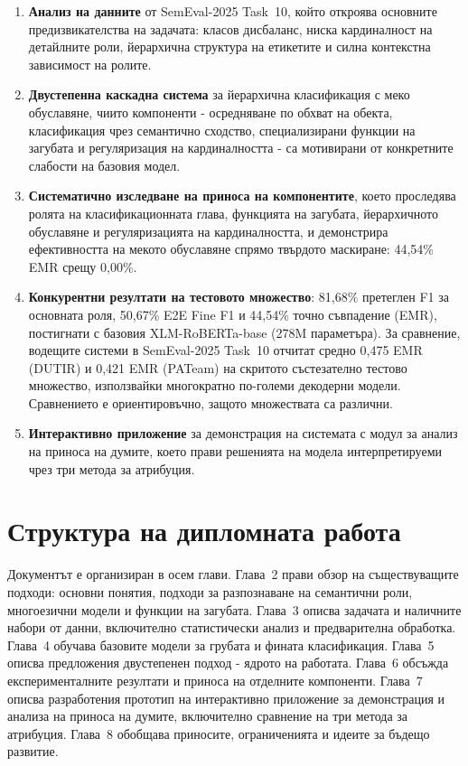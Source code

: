 \documentclass[12pt,a4paper]{report}
\begin{document}
\begin{enumerate}
  \item \textbf{Анализ на данните} от SemEval-2025 Task~10, който откроява основните предизвикателства на задачата: класов дисбаланс, ниска кардиналност на детайлните роли, йерархична структура на етикетите и силна контекстна зависимост на ролите.
  \item \textbf{Двустепенна каскадна система} за йерархична класификация с меко обуславяне, чиито компоненти - осредняване по обхват на обекта, класификация чрез семантично сходство, специализирани функции на загубата и регуляризация на кардиналността - са мотивирани от конкретните слабости на базовия модел.
  \item \textbf{Систематично изследване на приноса на компонентите}, което проследява ролята на класификационната глава, функцията на загубата, йерархичното обуславяне и регуляризацията на кардиналността, и демонстрира ефективността на мекото обуславяне спрямо твърдото маскиране: 44,54\% EMR срещу 0,00\%.
  \item \textbf{Конкурентни резултати на тестовото множество}: 81,68\% претеглен F1 за основната роля, 50,67\% E2E Fine F1 и 44,54\% точно съвпадение (EMR), постигнати с базовия XLM-RoBERTa-base (278M параметъра). За сравнение, водещите системи в SemEval-2025 Task~10 отчитат средно 0,475 EMR (DUTIR) и 0,421 EMR (PATeam) на скритото състезателно тестово множество, използвайки многократно по-големи декодерни модели. Сравнението е ориентировъчно, защото множествата са различни.
  \item \textbf{Интерактивно приложение} за демонстрация на системата с модул за анализ на приноса на думите, което прави решенията на модела интерпретируеми чрез три метода за атрибуция.
\end{enumerate}

\section{Структура на дипломната работа}

Документът е организиран в осем глави. Глава~2 прави обзор на съществуващите подходи: основни понятия, подходи за разпознаване на семантични роли, многоезични модели и функции на загубата. Глава~3 описва задачата и наличните набори от данни, включително статистически анализ и предварителна обработка. Глава~4 обучава базовите модели за грубата и фината класификация. Глава~5 описва предложения двустепенен подход - ядрото на работата. Глава~6 обсъжда експерименталните резултати и приноса на отделните компоненти. Глава~7 описва разработения прототип на интерактивно приложение за демонстрация и анализа на приноса на думите, включително сравнение на три метода за атрибуция. Глава~8 обобщава приносите, ограниченията и идеите за бъдещо развитие.
\end{document}
